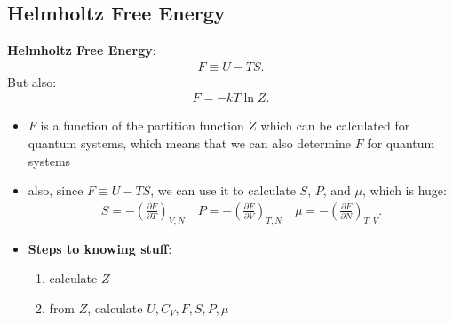 \documentclass[10pt]{article}
\begin{document}
\subsection{Helmholtz Free Energy}
\begin{definition}
    \textbf{Helmholtz Free Energy}:
    \begin{gather*}
        F \equiv U-TS
    .\end{gather*}
    But also:
    \begin{gather*}
        F = -kT \ln Z
    .\end{gather*}
\end{definition}
\begin{itemize}
    \item $F$ is a function of the partition function $Z$ which can be calculated for quantum systems, which means that we can also determine $F$ for quantum systems
    \item also, since $F \equiv U-TS$, we can use it to calculate $S$, $P$, and $\mu$, which is huge:
        \begin{gather*}
            S = -\left( \frac{\partial F}{\partial T}  \right)_{V,N} \quad P = - \left( \frac{\partial F}{\partial V}  \right)_{T,N} \quad \mu = - \left( \frac{\partial F}{\partial N}  \right)_{T,V}
        .\end{gather*}
    \item \textbf{Steps to knowing stuff}:
        \begin{enumerate}
            \item calculate $Z$
            \item from $Z$, calculate $U, C_V, F, S, P, \mu$
        \end{enumerate}
\end{itemize}
\end{document}
